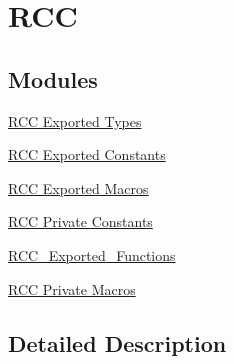 \hypertarget{group___r_c_c}{}\section{R\+CC}
\label{group___r_c_c}
\subsection*{Modules}
\begin{DoxyCompactItemize}
\item 
\hyperlink{group___r_c_c___exported___types}{R\+C\+C Exported Types}
\item 
\hyperlink{group___r_c_c___exported___constants}{R\+C\+C Exported Constants}
\item 
\hyperlink{group___r_c_c___exported___macros}{R\+C\+C Exported Macros}
\item 
\hyperlink{group___r_c_c___private___constants}{R\+C\+C Private Constants}
\item 
\hyperlink{group___r_c_c___exported___functions}{R\+C\+C\+\_\+\+Exported\+\_\+\+Functions}
\item 
\hyperlink{group___r_c_c___private___macros}{R\+C\+C Private Macros}
\end{DoxyCompactItemize}


\subsection{Detailed Description}
